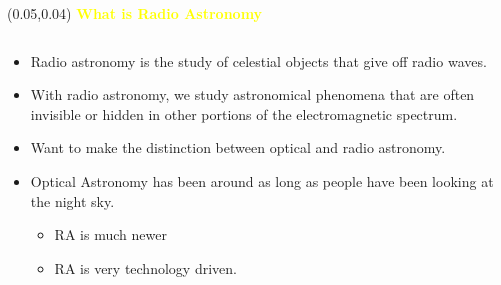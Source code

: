 \documentclass[aspectratio=169]{beamer} %
\begin{document}
\begin{frame}{}
    \setlength{\TPHorizModule}{\textwidth}
    \setlength{\TPVertModule}{\textwidth}
    \begin{textblock}{0.74}(0.05,0.04)
        \bfseries\huge\textcolor{yellow}{What is Radio Astronomy}
    \end{textblock}
    \begin{columns}
    \begin{column}{0.6\textwidth}

    \begin{itemize}
    \color{yellow}
        \item Radio astronomy is the study of celestial objects that give off radio waves.
        \item With radio astronomy, we study astronomical phenomena that are often invisible or hidden in other portions of the electromagnetic spectrum.
        \item Want to make the distinction between optical and radio astronomy.
        \item Optical Astronomy has been around as long as people have been looking at the night sky.
            \begin{itemize}
            \color{yellow}
        \item RA is much newer
        \item RA is very technology driven.
     \end{itemize}\end{itemize}


\end{column}
\end{columns}
\end{frame}
\end{document}
